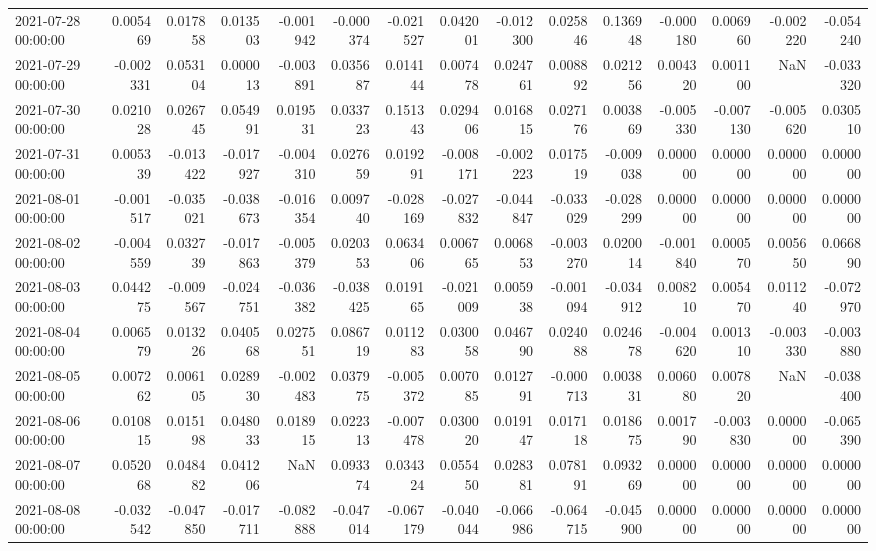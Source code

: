 \begin{tabular}{lrrrrrrrrrrrrrr}
2021-07-28 00:00:00 & 0.005469 & 0.017858 & 0.013503 & -0.001942 & -0.000374 & -0.021527 & 0.042001 & -0.012300 & 0.025846 & 0.136948 & -0.000180 & 0.006960 & -0.002220 & -0.054240 \\
2021-07-29 00:00:00 & -0.002331 & 0.053104 & 0.000013 & -0.003891 & 0.035687 & 0.014144 & 0.007478 & 0.024761 & 0.008892 & 0.021256 & 0.004320 & 0.001100 & NaN & -0.033320 \\
2021-07-30 00:00:00 & 0.021028 & 0.026745 & 0.054991 & 0.019531 & 0.033723 & 0.151343 & 0.029406 & 0.016815 & 0.027176 & 0.003869 & -0.005330 & -0.007130 & -0.005620 & 0.030510 \\
2021-07-31 00:00:00 & 0.005339 & -0.013422 & -0.017927 & -0.004310 & 0.027659 & 0.019291 & -0.008171 & -0.002223 & 0.017519 & -0.009038 & 0.000000 & 0.000000 & 0.000000 & 0.000000 \\
2021-08-01 00:00:00 & -0.001517 & -0.035021 & -0.038673 & -0.016354 & 0.009740 & -0.028169 & -0.027832 & -0.044847 & -0.033029 & -0.028299 & 0.000000 & 0.000000 & 0.000000 & 0.000000 \\
2021-08-02 00:00:00 & -0.004559 & 0.032739 & -0.017863 & -0.005379 & 0.020353 & 0.063406 & 0.006765 & 0.006853 & -0.003270 & 0.020014 & -0.001840 & 0.000570 & 0.005650 & 0.066890 \\
2021-08-03 00:00:00 & 0.044275 & -0.009567 & -0.024751 & -0.036382 & -0.038425 & 0.019165 & -0.021009 & 0.005938 & -0.001094 & -0.034912 & 0.008210 & 0.005470 & 0.011240 & -0.072970 \\
2021-08-04 00:00:00 & 0.006579 & 0.013226 & 0.040568 & 0.027551 & 0.086719 & 0.011283 & 0.030058 & 0.046790 & 0.024088 & 0.024678 & -0.004620 & 0.001310 & -0.003330 & -0.003880 \\
2021-08-05 00:00:00 & 0.007262 & 0.006105 & 0.028930 & -0.002483 & 0.037975 & -0.005372 & 0.007085 & 0.012791 & -0.000713 & 0.003831 & 0.006080 & 0.007820 & NaN & -0.038400 \\
2021-08-06 00:00:00 & 0.010815 & 0.015198 & 0.048033 & 0.018915 & 0.022313 & -0.007478 & 0.030020 & 0.019147 & 0.017118 & 0.018675 & 0.001790 & -0.003830 & 0.000000 & -0.065390 \\
2021-08-07 00:00:00 & 0.052068 & 0.048482 & 0.041206 & NaN & 0.093374 & 0.034324 & 0.055450 & 0.028381 & 0.078191 & 0.093269 & 0.000000 & 0.000000 & 0.000000 & 0.000000 \\
2021-08-08 00:00:00 & -0.032542 & -0.047850 & -0.017711 & -0.082888 & -0.047014 & -0.067179 & -0.040044 & -0.066986 & -0.064715 & -0.045900 & 0.000000 & 0.000000 & 0.000000 & 0.000000 \\

\end{tabular}
